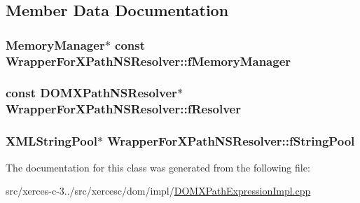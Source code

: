 \subsection{Member Data Documentation}
\hypertarget{classWrapperForXPathNSResolver_a41f1b5b1d7987561707fe57f04eb3b43}{
\subsubsection[{f\-Memory\-Manager}]{\setlength{\rightskip}{0pt plus 5cm}Memory\-Manager$\ast$ const Wrapper\-For\-X\-Path\-N\-S\-Resolver\-::f\-Memory\-Manager\hspace{0.3cm}{\ttfamily [protected]}}}\label{classWrapperForXPathNSResolver_a41f1b5b1d7987561707fe57f04eb3b43}
\hypertarget{classWrapperForXPathNSResolver_a19b57e29c83ec35173a3ba86e0bc5388}{
\subsubsection[{f\-Resolver}]{\setlength{\rightskip}{0pt plus 5cm}const D\-O\-M\-X\-Path\-N\-S\-Resolver$\ast$ Wrapper\-For\-X\-Path\-N\-S\-Resolver\-::f\-Resolver\hspace{0.3cm}{\ttfamily [protected]}}}\label{classWrapperForXPathNSResolver_a19b57e29c83ec35173a3ba86e0bc5388}
\hypertarget{classWrapperForXPathNSResolver_aa90e59916249c52dc021f2d2276205b8}{
\subsubsection[{f\-String\-Pool}]{\setlength{\rightskip}{0pt plus 5cm}X\-M\-L\-String\-Pool$\ast$ Wrapper\-For\-X\-Path\-N\-S\-Resolver\-::f\-String\-Pool\hspace{0.3cm}{\ttfamily [protected]}}}\label{classWrapperForXPathNSResolver_aa90e59916249c52dc021f2d2276205b8}


The documentation for this class was generated from the following file\-:\begin{DoxyCompactItemize}
\item 
src/xerces-\/c-\/3../src/xercesc/dom/impl/\hyperlink{DOMXPathExpressionImpl_8cpp}{D\-O\-M\-X\-Path\-Expression\-Impl.\-cpp}\end{DoxyCompactItemize}
